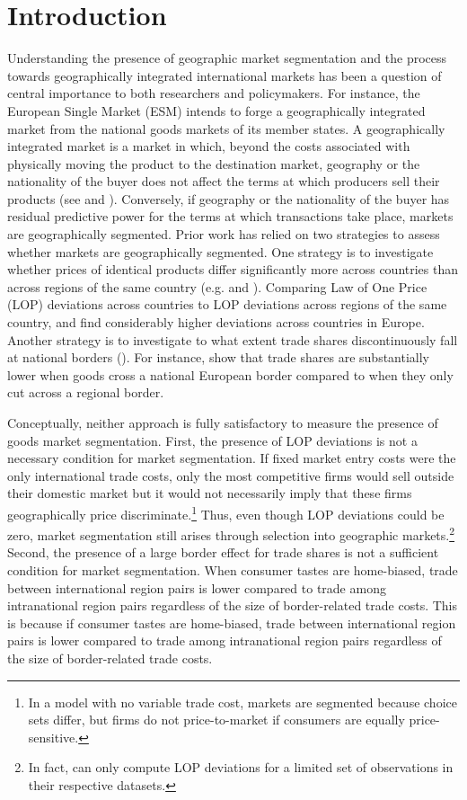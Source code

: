 \section{Introduction}  

Understanding the presence of geographic market segmentation and the process towards geographically integrated international markets has been a question of central importance to both researchers and policymakers. For instance, the European Single Market (ESM) intends to forge a geographically integrated market from the national goods markets of its member states. A geographically integrated market is a market in which, beyond the costs associated with physically moving the product to the destination market, geography or the nationality of the buyer does not affect the terms at which producers sell their products (see \citet{Flam1992} and \citet{Goldberg1997}). Conversely, if geography or the nationality of the buyer has residual predictive power for the terms at which transactions take place, markets are geographically segmented. Prior work has relied on two strategies to assess whether markets are geographically segmented. One strategy is to investigate whether prices of identical products differ significantly more across countries than across regions of the same country (e.g. \citet{Engel1996} and \citet{Goldberg1997}). Comparing Law of One Price (LOP) deviations across countries to LOP deviations across regions of the same country, \citet{Beck2020} and \citet{Fontaine2020} find considerably higher deviations across countries in Europe. Another strategy is to investigate to what extent trade shares discontinuously fall at national borders (\citet{McCallum1995}). For instance, \citet{Santamaria2023} show that trade shares are substantially lower when goods cross a national European border compared to when they only cut across a regional border.

Conceptually, neither approach is fully satisfactory to measure the presence of goods market segmentation. First, the presence of LOP deviations is not a necessary condition for market segmentation. If fixed market entry costs were the only international trade costs, only the most competitive firms would sell outside their domestic market but it would not necessarily imply that these firms geographically price discriminate.\footnote{In a \citet{Melitz2003} model with no variable trade cost, markets are segmented because choice sets differ, but firms do not price-to-market if consumers are equally price-sensitive.} Thus, even though LOP deviations could be zero, market segmentation still arises through selection into geographic markets.\footnote{In fact, \citet{Cavallo2014} \cite{Beck2020} can only compute LOP deviations for a limited set of observations in their respective datasets.} Second, the presence of a large border effect for trade shares is not a sufficient condition for market segmentation. When consumer tastes are home-biased, trade between international region pairs is lower compared to trade among intranational region pairs regardless of the size of border-related trade costs. This is because if consumer tastes are home-biased, trade between international region pairs is lower compared to trade among intranational region pairs regardless of the size of border-related trade costs.

